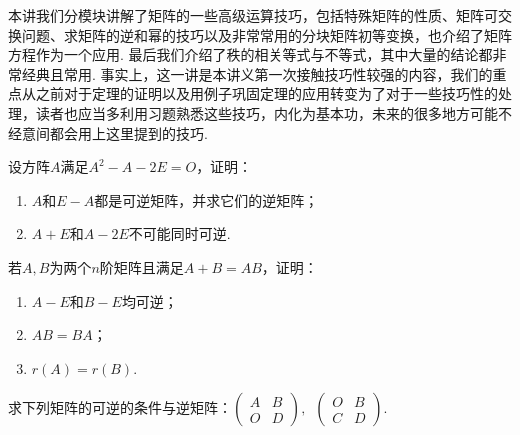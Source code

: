 \begin{summary}

    本讲我们分模块讲解了矩阵的一些高级运算技巧，包括特殊矩阵的性质、矩阵可交换问题、求矩阵的逆和幂的技巧以及非常常用的分块矩阵初等变换，也介绍了矩阵方程作为一个应用. 最后我们介绍了秩的相关等式与不等式，其中大量的结论都非常经典且常用. 事实上，这一讲是本讲义第一次接触技巧性较强的内容，我们的重点从之前对于定理的证明以及用例子巩固定理的应用转变为了对于一些技巧性的处理，读者也应当多利用习题熟悉这些技巧，内化为基本功，未来的很多地方可能不经意间都会用上这里提到的技巧.

\end{summary}

\begin{exercise}

    \begin{exgroup}
        \item 设方阵$A$满足$A^2-A-2E=O$，证明：
        \begin{enumerate}
            \item $A$和$E-A$都是可逆矩阵，并求它们的逆矩阵；

            \item $A+E$和$A-2E$不可能同时可逆.
        \end{enumerate}

        \item 若$A,B$为两个$n$阶矩阵且满足$A+B=AB$，证明：
        \begin{enumerate}
            \item $A-E$和$B-E$均可逆；

            \item $AB=BA$；

            \item $r(A)=r(B)$.
        \end{enumerate}

        \item 求下列矩阵的可逆的条件与逆矩阵：$\begin{pmatrix}
                A & B \\ O & D
            \end{pmatrix},\enspace \begin{pmatrix}
                O & B \\ C & D
            \end{pmatrix}$.
    \end{exgroup}


\end{exercise}
